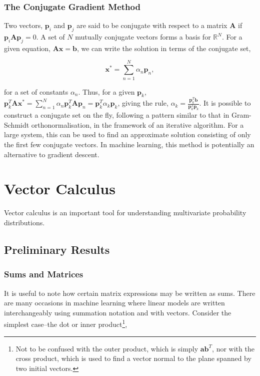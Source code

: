 \documentclass[11pt]{amsart}
\begin{document}
\subsubsection{The Conjugate Gradient Method}

Two vectors, $\mathbf{p}_i$ and $\mathbf{p}_j$ are said to be conjugate with respect to a matrix $\mathbf{A}$ if $\mathbf{p}_i\mathbf{A}\mathbf{p}_j = 0$. A set of $N$ mutually conjugate vectors forms a basis for $\mathbb{R}^N$. For a given equation, $\mathbf{A}\mathbf{x} = \mathbf{b}$, we can write the solution in terms of the conjugate set,

$$\mathbf{x}^* = \sum_{n=1}^N \alpha_n \mathbf{p}_n,$$

for a set of constants $\alpha_n$. Thus, for a given $\mathbf{p}_k$, $\mathbf{p}_k^T\mathbf{A}\mathbf{x}^* = \sum_{n=1}^N \alpha_n\mathbf{p}_k^T\mathbf{A}\mathbf{p}_n = \mathbf{p}_k^T\alpha_k\mathbf{p}_k$, giving the rule, $\alpha_k = \frac{\mathbf{p}_k^T\mathbf{b}}{\mathbf{p}_k^T\mathbf{p}_k}$. It is possible to construct a conjugate set on the fly, following a pattern similar to that in Gram-Schmidt orthonormalisation, in the framework of an iterative algorithm. For a large system, this can be used to find an approximate solution consisting of only the first few conjugate vectors. In machine learning, this method is potentially an alternative to gradient descent.

\section{Vector Calculus}

Vector calculus is an important tool for understanding multivariate probability distributions.

\subsection{Preliminary Results}

\subsubsection{Sums and Matrices}

It is useful to note how certain matrix expressions may be written as sums. There are many occasions in machine learning where linear models are written interchangeably using summation notation and with vectors. Consider the simplest case--the dot or inner product\footnote{Not to be confused with the outer product, which is simply $\mathbf{a}\mathbf{b}^T$, nor with the cross product, which is used to find a vector normal to the plane spanned by two initial vectors.},
\end{document}
